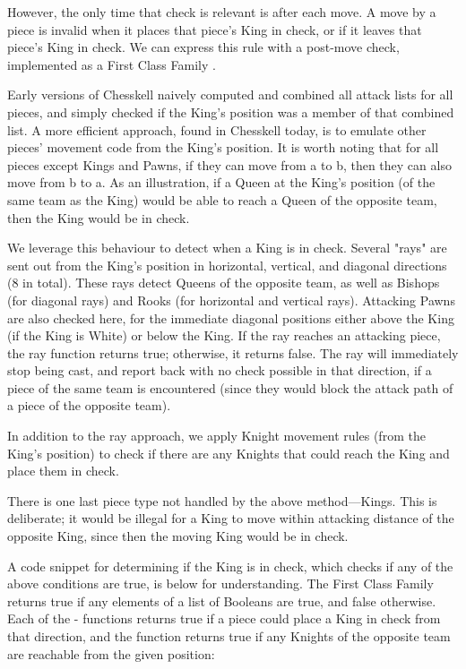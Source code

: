 However, the only time that check is relevant is after each move. A move by a piece is invalid when it places that piece's King in check, or if it leaves that piece's King in check. We can express this rule with a post-move check, implemented as a First Class Family .

Early versions of Chesskell naively computed and combined all attack lists for all pieces, and simply checked if the King's position was a member of that combined list. A more efficient approach, found in Chesskell today, is to emulate other pieces' movement code from the King's position. It is worth noting that for all pieces except Kings and Pawns, if they can move from a to b, then they can also move from b to a. As an illustration, if a Queen at the King's position (of the same team as the King) would be able to reach a Queen of the opposite team, then the King would be in check.

We leverage this behaviour to detect when a King is in check. Several "rays" are sent out from the King's position in horizontal, vertical, and diagonal directions (8 in total). These rays detect Queens of the opposite team, as well as Bishops (for diagonal rays) and Rooks (for horizontal and vertical rays). Attacking Pawns are also checked here, for the immediate diagonal positions either above the King (if the King is White) or below the King. If the ray reaches an attacking piece, the ray function returns true; otherwise, it returns false. The ray will immediately stop being cast, and report back with no check possible in that direction, if a piece of the same team is encountered (since they would block the attack path of a piece of the opposite team).

In addition to the ray approach, we apply Knight movement rules (from the King's position) to check if there are any Knights that could reach the King and place them in check.

There is one last piece type not handled by the above method---Kings. This is deliberate; it would be illegal for a King to move within attacking distance of the opposite King, since then the moving King would be in check.

A code snippet for determining if the King is in check, which checks if any of the above conditions are true, is below for understanding. The First Class Family  returns true if any elements of a list of Booleans are true, and false otherwise. Each of the - functions returns true if a piece could place a King in check from that direction, and the  function returns true if any Knights of the opposite team are reachable from the given position:

